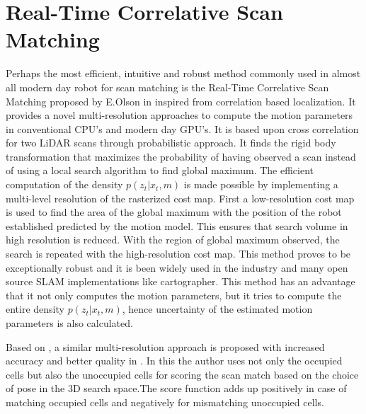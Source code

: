 \section{Real-Time Correlative Scan Matching}
Perhaps the most efficient, intuitive and robust method commonly used in almost all modern day robot for scan matching is the Real-Time Correlative Scan Matching proposed by E.Olson in \cite{E.B.Olson} inspired from \cite{Konolige} correlation based localization. It provides a novel multi-resolution approaches to compute the motion parameters in conventional CPU's and modern day GPU's. It is based upon cross correlation for two LiDAR scans through probabilistic approach. It finds the rigid body transformation that maximizes the probability of having observed a scan instead of using a local search algorithm to find global maximum. The efficient computation of the density $p(z_t | x_t, m)$ is made possible by implementing a multi-level resolution of the rasterized cost map. First a low-resolution cost map is used to find the area of the global maximum with the position of the robot established predicted by the motion model. This ensures that search volume in high resolution is reduced. With the region of global maximum observed, the search is repeated with the high-resolution cost map. This method proves to be exceptionally robust and it is been widely used in the industry and many open source SLAM implementations like cartographer. This method has an advantage that it not only computes the motion parameters, but it tries to compute the entire density $p(z_t | x_t, m)$, hence uncertainty of the estimated motion parameters is also calculated.
\par
Based on \cite{E.B.Olson}, a similar multi-resolution approach is proposed with increased accuracy and better quality in \cite{P.Vath}. In this the author uses not only the occupied cells but also the unoccupied cells for scoring the scan match based on the choice of pose in the 3D search space.The score function adds up positively in case of matching occupied cells and negatively for mismatching unoccupied cells.

